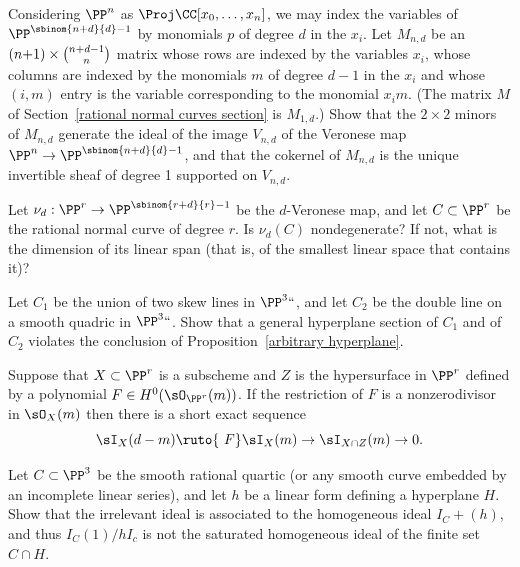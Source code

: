 \begin{exercise}\label{equations of Veroneses}
Considering $\PP^n$ as $\Proj \CC[x_0,\dots,x_n]$, we may index the
variables
of $\PP^{\sbinom{n+d}{d}-1}$ by  monomials $p$
of degree $d$ in the $x_i$. Let $M_{n,d}$ be an $(n{+}1)\times \tbinom{n+d-1}{n}$ matrix
whose rows are indexed by the variables $x_i$, whose columns are indexed by the monomials $m$ of degree $d-1$ in the $x_i$ and
whose $(i,m)$ entry is the variable corresponding to the monomial $x_im$. (The matrix
$M$ of Section~\ref{rational normal curves section} is $M_{1,d}$.)
Show that the $2\times 2$ minors of $M_{n,d}$ generate the ideal of the image $V_{n,d}$ of the Veronese map
$\PP^n\to \PP^{\sbinom{n+d}{d}-1}$, and that the cokernel of $M_{n,d}$ is the unique invertible sheaf of degree 1 supported on $V_{n,d}$.
\end{exercise}

\begin{exercise}
 Let $\nu_d: \PP^r \to \PP^{\sbinom{r+d}{r}-1}$ be the $d$-Veronese
 map, and let $C\subset \PP^r$ be the
rational normal curve
%
of degree $r$. Is $\nu_d(C)$ nondegenerate? If not, what is the dimension of its linear span (that is, of the smallest linear
 space that contains it)?
\end{exercise}

\begin{exercise}\label{arbitrary hyperplane examples}
Let $C_1$ be the union of two
\vadjust{\allowbreak}%
skew lines
%
in $\PP^3` `$, and let $C_2$ be the
double line
%
on a smooth quadric in $\PP^3` `$.
Show that a general hyperplane section of $C_1$ and of $C_2$  violates the conclusion of Proposition~\ref{arbitrary hyperplane}.
\end{exercise}

\begin{exercise}\label{restriction of ideals}
Suppose that $X\subset \PP^r$ is a subscheme and  $Z$ is the hypersurface in $\PP^r$ defined by a polynomial $F\in H^0(\sO_{\PP^r}(m))$. If the restriction of $F$ is a nonzerodivisor in
$\sO_X(m)$  then there is a short exact sequence
$$
\sI_X(d-m) \ruto {\ F} \sI_X(m) \to \sI_{X\cap Z}(m) \to 0.
$$
\end{exercise}

\begin{exercise}\label{bad restriction}
Let $C\subset \PP^3$ be the smooth rational quartic
%
(or any smooth curve embedded by an incomplete linear series), and let
$h$ be a linear form defining a hyperplane $H$.
Show that
the  irrelevant ideal is associated to the
homogeneous ideal $I_C+(h)$, and thus $I_C(1)/hI_c$ is not the saturated homogeneous ideal of the finite
set $C\cap H$.
\end{exercise}

